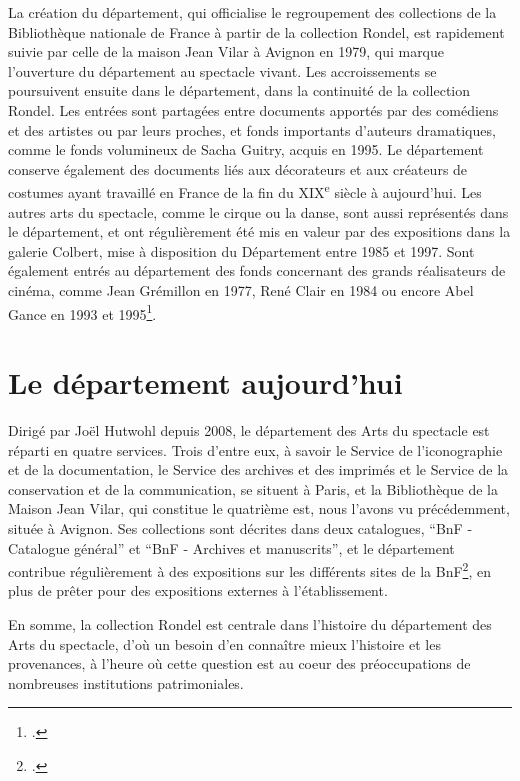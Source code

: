 La création du département, qui officialise le regroupement des collections de la Bibliothèque nationale de France à partir de la collection Rondel, est rapidement suivie par celle de la maison Jean Vilar à Avignon en 1979, qui marque l'ouverture du département au spectacle vivant. Les accroissements se poursuivent ensuite dans le département, dans la continuité de la collection Rondel. Les entrées sont partagées 
entre documents apportés par des comédiens et des artistes ou par leurs proches, et fonds importants d'auteurs dramatiques, comme le fonds volumineux de Sacha Guitry, acquis en 1995. Le département conserve également des documents liés aux décorateurs et aux créateurs de costumes ayant travaillé en France de la fin du XIX\textsuperscript{e} siècle à aujourd'hui. Les autres arts du spectacle, comme le cirque ou la danse, sont aussi représentés dans le département, et ont régulièrement été mis en valeur par des expositions dans la galerie Colbert, mise à disposition du Département entre 1985 et 1997. Sont également entrés au département des fonds concernant des grands réalisateurs de cinéma, comme Jean Grémillon en 1977, René Clair en 1984 ou encore Abel Gance en 1993 et 1995\footcite[p. 253-257]{giteau_2005}. 


\section{Le département aujourd'hui}

Dirigé par Joël Hutwohl depuis 2008, le département des Arts du spectacle est réparti en quatre services. Trois d'entre eux, à savoir le Service de l’iconographie et de la documentation, le Service des archives et des imprimés et le Service de la conservation et de la communication, se situent à Paris, et la Bibliothèque de la Maison Jean Vilar, qui constitue le quatrième est, nous l'avons vu précédemment, située à Avignon. Ses collections sont décrites dans deux catalogues, \enquote{BnF - Catalogue général} et \enquote{BnF - Archives et manuscrits}, et le département contribue régulièrement à des expositions sur les différents sites de la BnF\footcite{sitebnf}, en plus de prêter pour des expositions externes à l'établissement. 

En somme, la collection Rondel est centrale dans l'histoire du département des Arts du spectacle, d'où un besoin d'en connaître mieux l'histoire et les provenances, à l'heure où cette question est au coeur des préoccupations de nombreuses institutions patrimoniales. 






